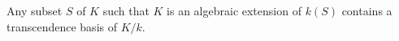Any subset $S$ of $K$ such that $K$ is an algebraic extension of $k(S)$ contains a transcendence basis of $K/k$.

